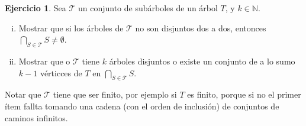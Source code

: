 \documentclass[12pt]{report}
\theoremstyle{plain}
\theoremstyle{definition}
\newtheorem{exercise}[theorem]{Ejercicio}
\newcommand{\naturals}{\mathbb{N}}
\begin{document}
\begin{exercise}\label{ejercicio:ejercicio sobre interseccion de subarboles en un arbol con dos items}
Sea $\mathcal T$ un conjunto de subárboles de un árbol $T$, y $k \in \naturals$.
\begin{enumerate}[(i)]
\item Mostrar que si los árboles de $\mathcal T$ no son disjuntos dos a dos, entonces $\bigcap_{S \in \mathcal T} S \neq \emptyset$.
\item Mostrar que o $\mathcal T$ tiene $k$ árboles disjuntos o existe un conjunto de a lo sumo $k-1$ vérticces
de $T$ en $\bigcap_{S \in \mathcal T} S$.
\end{enumerate}
\end{exercise}
Notar que $\mathcal T$ tiene que ser finito, por ejemplo si $T$ es finito, porque si no el primer ítem fallta
tomando una cadena (con el orden de inclusión) de conjuntos de caminos infinitos.
\end{document}
